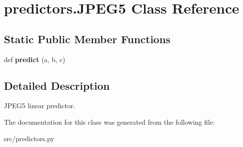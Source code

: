 \hypertarget{classpredictors_1_1JPEG5}{}\section{predictors.\+J\+P\+E\+G5 Class Reference}
\label{classpredictors_1_1JPEG5}
\subsection*{Static Public Member Functions}
\begin{DoxyCompactItemize}
\item 
\mbox{\label{classpredictors_1_1JPEG5_a6e5e2101c07ff237fb123dae9dff6847}} 
def {\bfseries predict} (a, b, c)
\end{DoxyCompactItemize}


\subsection{Detailed Description}
\begin{DoxyVerb}JPEG5 linear predictor.
\end{DoxyVerb}
 

The documentation for this class was generated from the following file\+:\begin{DoxyCompactItemize}
\item 
src/predictors.\+py\end{DoxyCompactItemize}
